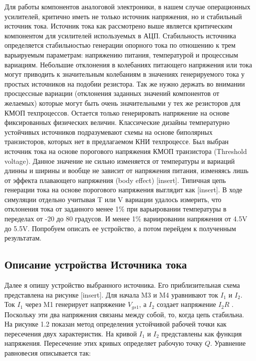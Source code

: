 \documentclass[a4paper,12pt]{article} %
\begin{document}
Для работы компонентов аналоговой электроники, в нашем случае операционных усилителей, критично иметь не только источник напряжения, но и стабильный источник тока. Источник тока как рассмотрено выше является критическим компонентом для усилителей используемых в АЦП. Стабильность источника определяется стабильностью генерации опорного тока по отношению к трем варьируемым параметрам: напряжению питания, температурой и процессным вариациям\cite{op_amp_comp10}. Небольшие отклонения в колебаниях питающего напряжения или тока могут приводить к значительным колебаниям в значениях генерируемого тока у простых источников на подобии резистора.  Так же нужно держать во внимании просцессные вариации (отклонения заданных  значений компонентов от желаемых) которые могут быть очень значительными у тех же резисторов для КМОП техпроцессов. Остается только генерировать напряжение на основе фиксированных физических величин. Классические дизайны температурно устойчивых источников подразумевают схемы на основе биполярных транзисторов, которых нет в предлагаемом КНИ техпроцессе. Был выбран источник тока на основе порогового напряжения КМОП транзистора (Threshold voltage)\cite{op_amp_comp11}. Данное значение не сильно изменяется от температуры и вариаций длинны и ширины и вообще не зависит от напряжения питания, изменяясь лишь от эффекта плавающего напряжения (body effect) [insert]. Типичная цепь генерации тока на основе порогового напряжения выглядит как [insert]. В ходе симуляции отдельно учитывая T или V вариации удалось измерить, что отклонения тока от заданного менее 1\% при варьировании температуры в переделах от -20 до 80 градусов. И менее 1\% вариировании напряжения от 4.5V до 5.5V. Попробуем описать ее устройство, а потом перейдем к полученным результатам.

\subsection{Описание устройства Источника тока }


Далее я опишу устройство выбранного источника. Его приблизительная схема представлена на рисунке [insert].
Для начала M3 и M4 уравнивают ток $ I_1 $ и $ I_2 $. Ток $I_1$ через M1 генерирует напряжение $V_{gs1}$, а $I_2$ создает напряжение $I_2 R $ . Поскольку эти два напряжения связаны между собой, то, когда цепь стабильна\cite{op_amp_comp12}. На рисунке 1.2 показан метод определения устойчивой рабочей  точки как пересечения двух характеристик. 
 На кривой $ I_1 $ и $ I_2 $ представлены как функция напряжения. Пересечение этих кривых определяет рабочую точку $Q$. Уравнение равновесия описывается так: 
\end{document}

